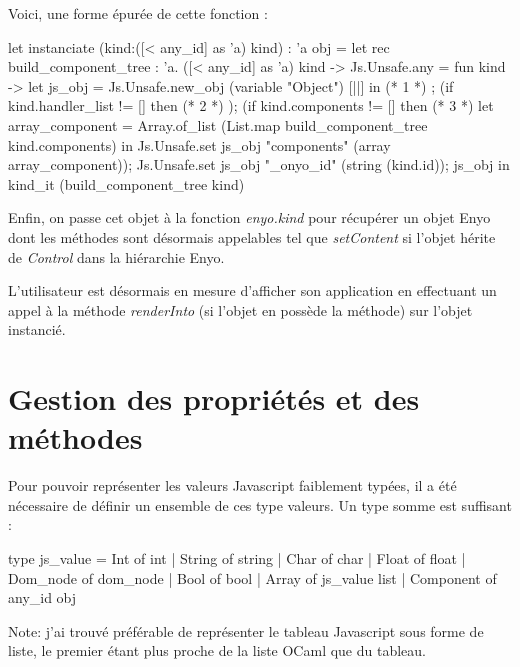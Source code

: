 \documentclass[11pt,a4paper]{report}
\begin{document}
Voici, une forme épurée de cette fonction :

\begin{OCaml}
    let instanciate (kind:([< any_id] as 'a) kind) : 'a obj =
      let rec build_component_tree : 'a. ([< any_id] as 'a) kind -> Js.Unsafe.any = fun kind ->
          let js_obj = Js.Unsafe.new_obj (variable "Object") [||]
          in
          (* 1 *)
          ;
          (if kind.handler_list != [] then
              (* 2 *)
          );
          (if kind.components != []  then
              (* 3 *)
              let array_component = Array.of_list (List.map build_component_tree kind.components) in
	      Js.Unsafe.set js_obj "components" (array array_component));
          Js.Unsafe.set js_obj "_onyo_id" (string (kind.id));
          js_obj in
       kind_it (build_component_tree kind)
\end{OCaml}


Enfin, on passe cet objet à la fonction \emph{enyo.kind} pour récupérer un objet Enyo
dont les méthodes sont désormais appelables tel que \emph{setContent} si l'objet hérite 
de \emph{Control} dans la hiérarchie Enyo.

L'utilisateur est désormais en mesure d'afficher son application en effectuant un appel
à la méthode \emph{renderInto} (si l'objet en possède la méthode) sur l'objet instancié.

\section{Gestion des propriétés et des méthodes}\label{gestprop}

Pour pouvoir représenter les valeurs Javascript faiblement typées, il a été nécessaire de définir un 
ensemble de ces type valeurs. Un type somme est suffisant :

\begin{OCaml}
    type js_value = Int of int | String of string 
                  | Char of char | Float of float 
                  | Dom_node of dom_node | Bool of bool 
                  | Array of js_value list | Component of any_id obj 
\end{OCaml}

Note: j'ai trouvé préférable de représenter le tableau Javascript sous forme de liste,
le premier étant plus proche de la liste OCaml que du tableau.\medskip
\end{document}
